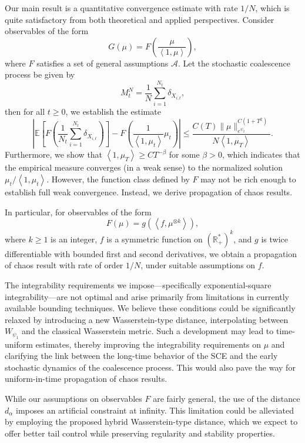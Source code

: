 \documentclass[11pt,a4paper]{article}
\newcommand{\brac}[1]{\left\langle#1\right\rangle}
\begin{document}
Our main result is a quantitative convergence estimate with rate $1/N$, which is quite satisfactory from both theoretical and applied perspectives. Consider observables of the form
\[
G(\mu) = F\left( \frac{\mu}{\brac{1,\mu}} \right),
\]
where $F$ satisfies a set of general assumptions $\mathcal{A}$. Let the stochastic coalescence process be given by
\[
M_t^N = \frac{1}{N} \sum_{i=1}^{N_t} \delta_{X_{i,t}},
\]
then for all $t \geq 0$, we establish the estimate
\[
\left| \mathbb{E} \left[ F\left( \frac{1}{N_t} \sum_{i=1}^{N_t} \delta_{X_{i,t}} \right) \right] - F\left( \frac{1}{\brac{1,\mu_t}} \mu_t \right) \right| \leq \frac{C(T) \|\mu\|_{e^{\psi_2}}^{C(1 + T^2)}}{N \brac{1,\mu_T}}.
\]
Furthermore, we show that $\brac{1,\mu_T} \geq C T^{-\beta}$ for some $\beta > 0$, which indicates that the empirical measure converges (in a weak sense) to the normalized solution $\mu_t / \brac{1,\mu_t}$. However, the function class defined by $F$ may not be rich enough to establish full weak convergence. Instead, we derive propagation of chaos results.

In particular, for observables of the form
\[
F(\mu) = g\left( \left\langle f, \mu^{\otimes k} \right\rangle \right),
\]
where $k \geq 1$ is an integer, $f$ is a symmetric function on $(\mathbb{R}_+^*)^k$, and $g$ is twice differentiable with bounded first and second derivatives, we obtain a propagation of chaos result with rate of order $1/N$, under suitable assumptions on $f$.

The integrability requirements we impose—specifically exponential-square integrability—are not optimal and arise primarily from limitations in currently available bounding techniques. We believe these conditions could be significantly relaxed by introducing a new Wasserstein-type distance, interpolating between $W_{\psi_1}$ and the classical Wasserstein metric. Such a development may lead to time-uniform estimates, thereby improving the integrability requirements on $\mu$ and clarifying the link between the long-time behavior of the SCE and the early stochastic dynamics of the coalescence process. This would also pave the way for uniform-in-time propagation of chaos results.

While our assumptions on observables $F$ are fairly general, the use of the distance $d_\alpha$ imposes an artificial constraint at infinity. This limitation could be alleviated by employing the proposed hybrid Wasserstein-type distance, which we expect to offer better tail control while preserving regularity and stability properties.
\end{document}

